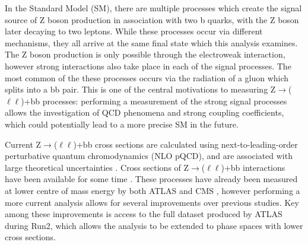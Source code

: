 \documentclass[12pt,a4paper,epsf,portrait,times,epsfig]{article}
\begin{document}
	In the Standard Model (SM), there are multiple processes which create the signal source of Z boson production in association with two b quarks, with the Z boson later decaying to two leptons. While these processes occur via different mechanisms, they all arrive at the same final state which this analysis examines. The Z boson production is only possible through the electroweak interaction, however strong interactions also take place in each of the signal processes. The most common of the these processes occurs via the radiation of a gluon which splits into a bb pair. This is one of the central motivations to measuring Z$\rightarrow$($\ell\ell$)+bb processes: performing a measurement of the strong signal processes allows the investigation of QCD phenomena and strong coupling coefficients, which could potentially lead to a more precise SM in the future. \par
	
	Current Z$\rightarrow$($\ell\ell$)+bb cross sections are calculated using next-to-leading-order perturbative quantum chromodynamics (NLO pQCD), and are associated with large theoretical uncertainties \cite{Article:EarlyQCDCrossSections}. Cross sections of Z$\rightarrow$($\ell\ell$)+bb interactions have been available for some time \cite{Article:HeavyFlavourXsec1, Article:HeavyFlavourXsec2, Article:HeavyFlavourXsec3}. These processes have already been measured at lower centre of mass energy by both ATLAS \cite{Article:EarlyATLASCrossSecMeasurement}
	and CMS \cite{Article:EarlyCMSCrossSecMeasurement}, however performing a more current analysis allows for several improvements over previous studies. Key among these improvements is access to the full dataset produced by ATLAS during Run2, which allows the analysis to be extended to phase spaces with lower cross sections. \par
	

	
\end{document}

